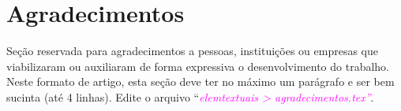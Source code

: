 \section*{Agradecimentos}

Seção reservada para agradecimentos a pessoas, instituições ou empresas que viabilizaram ou auxiliaram de forma expressiva o desenvolvimento do trabalho. Neste formato de artigo, esta seção deve ter no máximo um parágrafo e ser bem sucinta (até 4 linhas). Edite o arquivo ``\textcolor{magenta}{\textit{elemtextuais > agradecimentos.tex''}}.